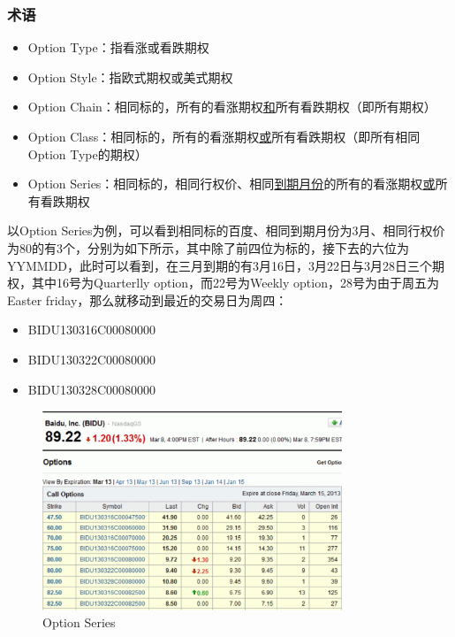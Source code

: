 \documentclass[11pt]{article}
\begin{document}
\subsubsection*{术语}

\begin{itemize}
    \item Option Type：指看涨或看跌期权
    \item Option Style：指欧式期权或美式期权
    \item Option Chain：相同标的，所有的看涨期权\uline{和}所有看跌期权（即所有期权）
    \item Option Class：相同标的，所有的看涨期权\uline{或}所有看跌期权（即所有相同Option Type的期权）
    \item Option Series：相同标的，相同行权价、相同\uline{到期月份}的所有的看涨期权\uline{或}所有看跌期权
\end{itemize}

以Option Series为例，可以看到相同标的百度、相同到期月份为3月、相同行权价为80的有3个，分别为如下所示，其中除了前四位为标的，接下去的六位为YYMMDD，此时可以看到，在三月到期的有3月16日，3月22日与3月28日三个期权，其中16号为Quarterlly option，而22号为Weekly option，28号为由于周五为Easter friday，那么就移动到最近的交易日为周四：
\begin{itemize}
    \item BIDU130316C00080000
    \item BIDU130322C00080000
    \item BIDU130328C00080000
\end{itemize}

\begin{figure}[H]
    \centering
    \includegraphics[width=0.8\textwidth]{fig/option-series.png}
    \caption{Option Series}
    \label{fig:option-series}
\end{figure}
\end{document}

